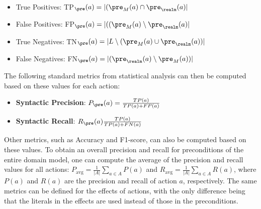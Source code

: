 
 \begin{itemize}
    \item True Positives: TP$_\pre(a)=|(\pre_M(a)\cap \pre_\realm(a)|$
    \item False Positives: FP$_\pre(a)=|((\pre_M(a)\setminus \pre_\realm(a)|$
    \item True Negatives: TN$_\pre(a)=|L \setminus(\pre_M(a)\cup \pre_\realm(a))|$
    \item False Negatives: FN$_\pre(a)=|(\pre_\realm(a)\setminus \pre_M(a))|$
\end{itemize}
The following standard metrics from statistical analysis can then be computed based on these values for each action:
\begin{itemize}
    \item \textbf{Syntactic Precision}: $P_\pre(a)=\frac{TP(a)}{TP(a)+FP(a)}$
    \item \textbf{Syntactic Recall}: $R_\pre(a)\frac{TP(a)}{TP(a)+FN(a)}$
\end{itemize}
Other metrics, such as Accuracy and F1-score, can also be computed based on these values. 
To obtain an overall precision and recall for preconditions of the entire domain model, one can compute the average of the precision and recall values for all actions:
$P_\text{avg}=\frac{1}{|A|}\sum_{a\in A} P(a)$ and $R_\text{avg}=\frac{1}{|A|}\sum_{a\in A} R(a)$, where $P(a)$ and $R(a)$ are the precision and recall of action $a$, respectively. 
The same metrics can be defined for the effects of actions, with the only difference being that the literals in the effects are used instead of those in the preconditions. 

